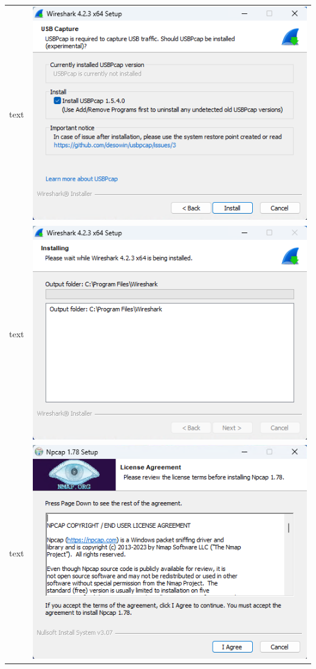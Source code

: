\documentclass[11pt,a4paper]{report}
\begin{document}
\begin{tabular}{ l r }
            text & \includegraphics[scale=1.0]{wireshark09} \\
            text & \includegraphics[scale=1.0]{wireshark10} \\
            text & \includegraphics[scale=1.0]{wireshark11} \\

\end{tabular}
\end{document}
